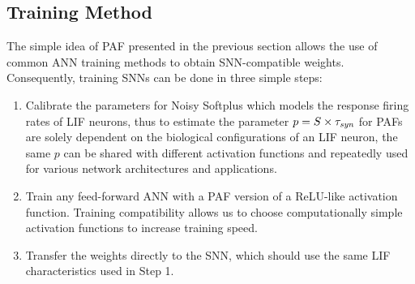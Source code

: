 	\subsection{Training Method}
	\label{subsec:ns_train}

	The simple idea of PAF presented in the previous section allows the use of common ANN training methods to obtain SNN-compatible weights.
	Consequently, training SNNs can be done in three simple steps: 
	 \begin{enumerate} 
		\item Calibrate the parameters \DIFdelbegin {}\DIFdelend \DIFaddbegin {}\DIFaddend for Noisy Softplus which models the response firing rates of LIF neurons, thus to estimate the parameter $p=S \times \tau_{\textit{\textrm{syn}}}$ for PAFs \DIFdelbegin {}\DIFdelend \DIFaddbegin {}\DIFaddend are solely dependent on the biological configurations of an LIF neuron, the same $p$ can be shared with different activation functions and repeatedly used for various network architectures and applications.
		\item Train any feed-forward ANN with a PAF version of a ReLU-like activation function.
		Training compatibility allows us to choose computationally simple activation functions to increase training speed.
		\DIFaddbegin 

		\DIFaddend %
		\item Transfer the \DIFaddbegin {}\DIFaddend weights directly to the SNN, which should use the same LIF characteristics used in Step 1.
	 \end{enumerate} 

